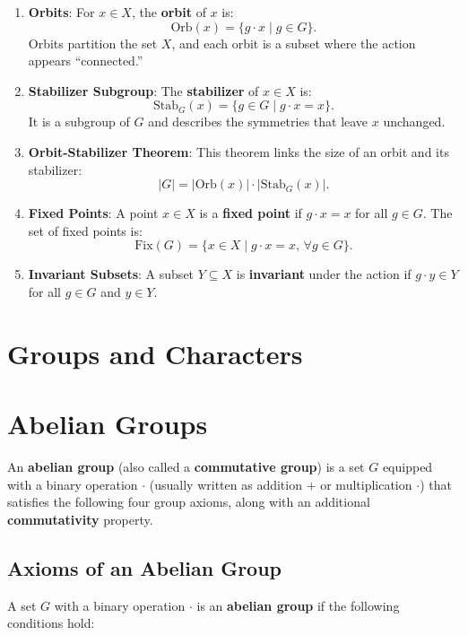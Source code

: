 \documentclass[11pt]{article}
\theoremstyle{definition}
\begin{document}
\begin{enumerate}
    \item \textbf{Orbits}:
    For \( x \in X \), the \textbf{orbit} of \( x \) is:
    \[
    \text{Orb}(x) = \{g \cdot x \mid g \in G\}.
    \]
    Orbits partition the set \( X \), and each orbit is a subset where the action appears ``connected.''

    \item \textbf{Stabilizer Subgroup}:
    The \textbf{stabilizer} of \( x \in X \) is:
    \[
    \text{Stab}_G(x) = \{g \in G \mid g \cdot x = x\}.
    \]
    It is a subgroup of \( G \) and describes the symmetries that leave \( x \) unchanged.

    \item \textbf{Orbit-Stabilizer Theorem}:
    This theorem links the size of an orbit and its stabilizer:
    \[
    |G| = |\text{Orb}(x)| \cdot |\text{Stab}_G(x)|.
    \]

    \item \textbf{Fixed Points}:
    A point \( x \in X \) is a \textbf{fixed point} if \( g \cdot x = x \) for all \( g \in G \). The set of fixed points is:
    \[
    \text{Fix}(G) = \{x \in X \mid g \cdot x = x, \, \forall g \in G\}.
    \]

    \item \textbf{Invariant Subsets}:
    A subset \( Y \subseteq X \) is \textbf{invariant} under the action if \( g \cdot y \in Y \) for all \( g \in G \) and \( y \in Y \).
\end{enumerate}



\section*{Groups and Characters}

\section{Abelian Groups}

An \textbf{abelian group} (also called a \textbf{commutative group}) is a set \( G \) equipped with a binary operation \( \cdot \) (usually written as addition \( + \) or multiplication \( \cdot \)) that satisfies the following four group axioms, along with an additional \textbf{commutativity} property.

\subsection{Axioms of an Abelian Group}
A set \( G \) with a binary operation \( \cdot \) is an \textbf{abelian group} if the following conditions hold:
\end{document}
